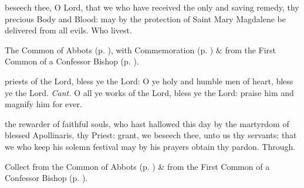 
\postcommunion
{} beseech thee, O Lord, that we who have received the only and saving remedy, thy precious Body and Blood: may by the protection of Saint Mary Magdalene be delivered from all evils. Who livest.



\begin{rubric}
	The Common of Abbots (p. \pageref{CommonAbbots}), with Commemoration  (p. \pageref{ApollinarisRavenna}) \&  from the First Common of a Confessor Bishop (p. \pageref{CommonConfessorBishopI}).
\end{rubric}


\label{ApollinarisRavenna}

\introit
{} priests of the Lord, bless ye the Lord: O ye holy and humble men of heart, bless ye the Lord. \textit{Cant.} O all ye works of the Lord, bless ye the Lord: praise him and magnify him for ever. 

\collect
{} the rewarder of faithful souls, who hast hallowed this day by the martyrdom of blessed Apollinaris, thy Priest: grant, we beseech thee, unto us thy servants; that we who keep his solemn festival may by his prayers obtain thy pardon. Through.

\begin{rubric}
	 Collect  from the Common of Abbots (p. \pageref{CommonAbbotsCollect}) \&   from the First Common of a Confessor Bishop (p. \pageref{CommonConfessorBishopICollect}).
\end{rubric}

